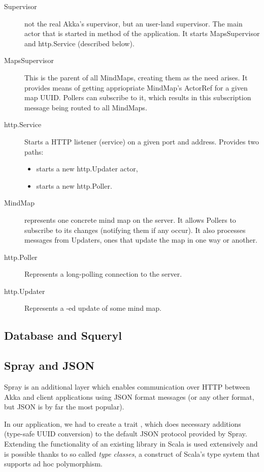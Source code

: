 \begin{description}
	\item[Supervisor] not the real Akka's supervisor, but an user-land supervisor. The main actor that is started in  method of the application. It starts MapsSupervisor and http.Service (described below).
	\item[MapsSupervisor] This is the parent of all MindMaps, creating them as the need arises. It provides means of getting appriopriate MindMap's ActorRef for a given map UUID. Pollers can subscribe to it, which results in this subscription message being routed to all MindMaps.
	\item[http.Service] Starts a HTTP listener (service) on a given port and address. Provides two paths: \begin{itemize}
		\item {} starts a new http.Updater actor,
		\item {} starts a new http.Poller.
	\end{itemize}
	\item[MindMap] represents one concrete mind map on the server. It allows Pollers to subscribe to its changes (notifying them if any occur). It also processes messages from Updaters, ones that update the map in one way or another.
	\item[http.Poller] Represents a long-polling connection to the server.
	\item[http.Updater] Represents a -ed update of some mind map.
\end{description}

\subsection{Database and Squeryl}
\label{subsection:akka-database}


\subsection{Spray and JSON}
\label{subsection:akka-spray}
Spray is an additional layer which enables communication over HTTP between Akka and client applications using JSON format messages (or any other format, but JSON is by far the most popular).

In our application, we had to create a trait , which does necessary additions (type-safe UUID conversion) to the default JSON protocol provided by Spray. Extending the functionality of an existing library in Scala is used extensively and is possible thanks to so called \emph{type classes}, a construct of Scala's type system that supports ad hoc polymorphism.

